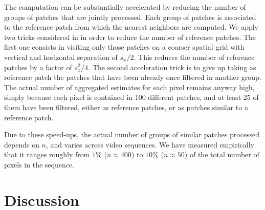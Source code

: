 \documentclass[10pt, journal, twocolumn, final, a4paper]{IEEEtran}
\newcommand{\pcomment}[1]{}
\begin{document}
The computation can be substantially accelerated by reducing the 
number of groups of patches that are jointly processed.
Each group of patches is associated to the reference patch from which 
the nearest neighbors are computed.
We apply two tricks
considered in \cite{Dabov2007tip,Lebrun2013ipol} in order to reduce the number of reference patches. 
The first one consists in visiting only 
those patches on a coarser spatial grid with vertical and horizontal separation
of $s_x/2$. This reduces the number of reference patches by a factor of
$s_x^2/4$. The second acceleration trick is to give up taking as reference
patch the patches that have been already once filtered in another group. 
The actual number of aggregated estimates for each pixel remains anyway high,
simply because each pixel is contained in 100 different patches, and at least
25 of them have been filtered, either as reference patches, or as patches
similar to a reference patch.

Due to these speed-ups, the actual number of groups of similar patches processed
depends on $n$, and varies across video sequences. We have measured empirically
that it ranges roughly from $1\%$ ($n \approx 400$) to $10\%$ ($n \approx 50$) of the total
number of pixels in the sequence. 
\pcomment{Check this numbers!}


\section{Discussion}
\label{sec:discussion}
\end{document}
